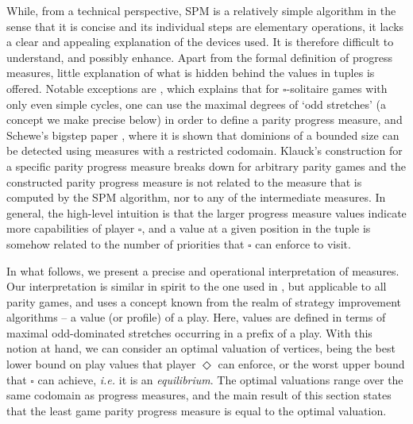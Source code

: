 \documentclass{eptcs}
\newcommand{\odd}{\ensuremath{\square}\xspace}
\newcommand{\even}{\ensuremath{\Diamond}\xspace}
\newcommand{\ie}{\emph{i.e.}\xspace}
\begin{document}
\def\allplays{\Pi}
\def\profilesym{\theta}
\newcommand{\profilefun}[1]{\profilesym_{#1}}
\newcommand{\profile}[2]{\profilesym_{#1}(#2)}

\newcommand{\maxval}[2]{\varphi^{*}_{#1}(#2)}

\newcommand{\succtup}[2]{\textsf{succ}_{#1}(#2)}

While, from a technical perspective, SPM is a relatively simple
algorithm in the sense that it is
concise and its individual steps are elementary operations, it lacks
a clear and appealing explanation of the devices used. It is therefore
difficult to understand, and possibly enhance. Apart from the formal
definition of progress measures, little explanation
of what is hidden behind the values in tuples is offered.
Notable exceptions are \cite{Klau:01}, which explains that for
$\odd$-solitaire games with only even simple cycles, one can use the 
maximal degrees of `odd
stretches' (a concept we make precise below) in order to define a
parity progress measure, and Schewe's bigstep paper \cite{Sch:07},
where it is shown that dominions of a bounded size can be detected
using measures with a restricted codomain. Klauck's construction
for a specific parity progress measure breaks down for arbitrary parity
games and the constructed parity progress measure is not related to
the measure that is computed by the SPM algorithm, nor to any of the
intermediate measures. In general, the  high-level
intuition is that the larger progress measure values indicate more
capabilities of player $\odd$, and a value at a given position in the
tuple is somehow related to the number of priorities that $\odd$
can enforce to visit.\medskip

In what follows, we present a precise and operational interpretation
of measures. Our interpretation is similar in spirit to the one used in \cite{Klau:01},
but applicable to all parity games, and uses a concept known
from the realm of strategy improvement algorithms -- a value (or
profile) of a play. Here, values are defined in terms of maximal odd-dominated
stretches occurring in a prefix of a play. With this notion at hand,
we can consider an optimal valuation of vertices, being the best
lower bound on play values that player $\even$ can enforce, or the
worst upper bound that $\odd$ can achieve, \ie it is an \emph{equilibrium}.
The optimal valuations range over the same codomain as progress
measures, and the main result of this section states that the least
game parity progress measure is equal to the optimal valuation.\medskip
\end{document}
